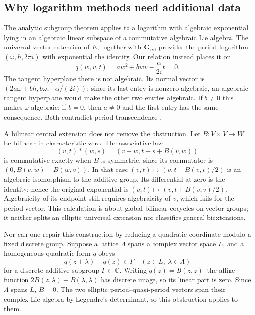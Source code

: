 \subsection{Why logarithm methods need additional data}
The analytic subgroup theorem applies to a logarithm with algebraic
exponential lying in an algebraic linear subspace of a commutative
algebraic Lie algebra.  The universal vector extension of $E$,
together with $\mathbf G_m$, provides the period logarithm
$(\omega,h,2\pi i)$ with exponential the identity.  Our relation
instead places it on
\[
 q(w,v,t)=aw^2+bwv-\frac\alpha{2i}t=0.
\]
The tangent hyperplane there is not algebraic.  Its normal vector is
$(2a\omega+bh,b\omega,-\alpha/(2i))$; since its last entry is nonzero
algebraic, an algebraic tangent hyperplane would make the other two
entries algebraic.  If $b\ne0$ this makes $\omega$ algebraic; if
$b=0$, then $a\ne0$ and the first entry has the same consequence.
Both contradict period transcendence
\cite[Corollary~3]{Waldschmidt}.

A bilinear central extension does not remove the obstruction.
Let $B:V\times V\to W$ be bilinear in characteristic zero.  The
associative law
\[
 (v,t)*(w,s)=(v+w,t+s+B(v,w))
\]
is commutative exactly when $B$ is symmetric, since its commutator is
$(0,B(v,w)-B(w,v))$.  In that case
$(v,t)\mapsto(v,t-B(v,v)/2)$ is an algebraic isomorphism to the additive
group.  Its differential at zero is the identity; hence the original
exponential is $(v,t)\mapsto(v,t+B(v,v)/2)$.  Algebraicity of its
endpoint still requires algebraicity of $v$, which fails for the
period vector.  This calculation is about global bilinear cocycles
on vector groups; it neither splits an elliptic universal extension
nor classifies general biextensions.

Nor can one repair this construction by reducing a quadratic coordinate
modulo a fixed discrete group.  Suppose a lattice $\Lambda$ spans a
complex vector space $L$, and a homogeneous quadratic form $q$ obeys
\[
 q(z+\lambda)-q(z)\in\Gamma
 \quad(z\in L,\ \lambda\in\Lambda)
\]
for a discrete additive subgroup $\Gamma\subset\mathbb C$.
Writing $q(z)=B(z,z)$, the affine function
$2B(z,\lambda)+B(\lambda,\lambda)$ has discrete image, so its linear
part is zero.  Since $\Lambda$ spans $L$, $B=0$.  The two elliptic
period--quasi-period vectors span their complex Lie algebra by
Legendre's determinant, so this obstruction applies to them.

